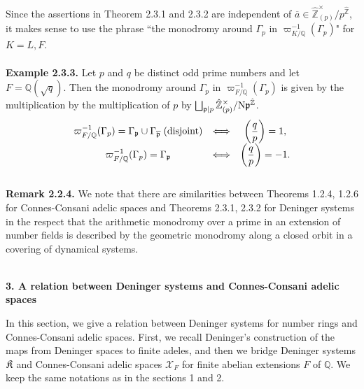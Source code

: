 \documentclass[12pt, leqno]{article}
\begin{document}
Since the assertions in Theorem 2.3.1 and 2.3.2 are independent of $\overline{a} \in \hat{\mathbb{Z}}_{(p)}^{\times}/p^{\hat{\mathbb{Z}}}$,
it makes sense to use the phrase ``the monodromy around $\Gamma_p$ in $\varpi_{K/\mathbb{Q}}^{-1}(\Gamma_p)$" for $K = L, F$.
\\
\\
{\bf Example 2.3.3.} Let $p$ and $q$ be distinct odd prime numbers and let $F = \mathbb{Q}(\sqrt{q})$. Then the monodromy around 
$\Gamma_p$ in  $\varpi_{F/\mathbb{Q}}^{-1}(\Gamma_p)$ is given by the multiplication by the multiplication of $p$ by 
$\bigsqcup_{\frak{p} \mid p} \hat{\mathbb{Z}}_{(p)}^{\times}/{\rm N}\frak{p}^{\hat{\mathbb{Z}}}$.
$$ \begin{array}{ccc}
\varpi_{F/\mathbb{Q}}^{-1}(\Gamma_p) = \Gamma_{\frak{p}} \cup \Gamma_{\overline{\frak{p}}} \; (\mbox{disjoint}) & \Longleftrightarrow & \displaystyle{\left( \frac{q}{p} \right)}= 1,\\
\varpi_{F/\mathbb{Q}}^{-1}(\Gamma_p) = \Gamma_{\frak{p}}   & \Longleftrightarrow & \displaystyle{\left( \frac{q}{p} \right)} = -1.\\
\end{array}
$$
\\
{\bf Remark 2.2.4.}  We note that there are similarities between Theorems 1.2.4, 1.2.6 for Connes-Consani adelic spaces and Theorems 2.3.1, 2.3.2 for Deninger systems in the respect that the arithmetic monodromy over a prime in an extension of number fields is described by the geometric monodromy along a closed orbit in a covering of dynamical systems. \\
\\


\begin{center}
{\bf 3.  A relation between Deninger systems and Connes-Consani adelic spaces}
\end{center}

In this section, we give a relation between Deninger systems for number rings and Connes-Consani adelic spaces. First, we recall Deninger's construction of the maps from Deninger spaces to finite adeles,
and  then we bridge Deninger systems $\frak{K}$ and Connes-Consani adelic spaces $\mathscr{X}_F$ for finite abelian extensions $F$ of $\mathbb{Q}$. We keep the same notations as in the sections 1 and 2. \\
\end{document}
